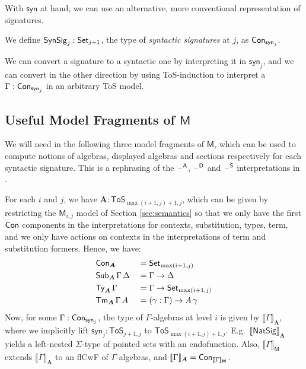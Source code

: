 \documentclass[sigplan,review,anonymous]{acmart}\settopmatter{printfolios=true,printccs=false,printacmref=false}
\newcommand{\ToS}{\mathsf{ToS}}
\newcommand{\NatSig}{\mathsf{NatSig}}
\newcommand{\syn}{\mathsf{syn}}
\newcommand{\SynSig}{\mathsf{SynSig}}
\newcommand{\bA}{\boldsymbol{A}}
\newcommand{\bM}{\boldsymbol{\mathsf{M}}}
\newcommand{\llb}{\llbracket}
\newcommand{\rrb}{\rrbracket}
\begin{document}
With $\syn$ at hand, we can use an alternative, more conventional representation of
signatures.

\begin{definition} We define $\SynSig_j : \Set_{j+1}$, the type of \emph{syntactic signatures} at $j$, as $\Con_{\syn_j}$.
\end{definition}

We can convert a signature to a syntactic one by interpreting it in $\syn_j$,
and we can convert in the other direction by using ToS-induction to interpret a
$\Gamma : \Con_{\syn_j}$ in an arbitrary ToS model.

\subsection{Useful Model Fragments of $\bM$}

We will need in the following three model fragments of $\bM$, which can be used
to compute notions of algebras, displayed algebras and sections respectively for
each syntactic signature. This is a rephrasing of the $\mathord{\hspace{1pt}\text{--}\hspace{1pt}}^{\mathsf{A}}$,
$\mathord{\hspace{1pt}\text{--}\hspace{1pt}}^{\mathsf{D}}$ and $\mathord{\hspace{1pt}\text{--}\hspace{1pt}}^{\mathsf{S}}$ interpretations in
\cite{kaposi2019constructing}.

\begin{definition}[The $\Set$ model of $\ToS$] For each $i$ and $j$, we have $\bA : \ToS_{\max(i+1, j)+1, j}$, which can be given by restricting the $\bM_{i,j}$ model
of Section \ref{sec:semantics} so that we only have the first $\mathsf{Con}$ components
in the interpretations for contexts, substitution, types, term, and we only have
actions on contexts in the interpretations of term and substitution
formers. Hence, we have:
\begin{alignat*}{3}
  & \Con_{\bA} && = \Set_{\max(i+1, j)} \\
  & \Sub_{\bA}\,\Gamma\,\Delta && = \Gamma \ra \Delta\\
  & \Ty_{\bA}\,\Gamma && = \Gamma \ra \Set_{\max(i+1, j)}\\
  & \Tm_{\bA}\,\Gamma\,A && = (\gamma : \Gamma) \ra A\,\gamma
\end{alignat*}
Now, for some $\Gamma : \Con_{\syn_j}$, the type of $\Gamma$-algebras at level
$i$ is given by $\llb\Gamma\rrb_{\bA}$, where we implicitly lift $\syn_j :
\ToS_{j+1, j}$ to $\ToS_{\max(i+1,j)+1, j}$. E.g.\, $\llb\NatSig\rrb_{\bA}$
yields a left-nested $\Sigma$-type of pointed sets with an endofunction. Also,
$\llb\Gamma\rrb_{\bM}$ extends $\llb\Gamma\rrb_{\bA}$ to an flCwF of
$\Gamma$-algebras, and $\llb\Gamma\rrb_{\bA} = \Con_{\llb\Gamma\rrb_{\bM}}$.
\end{definition}
\end{document}
